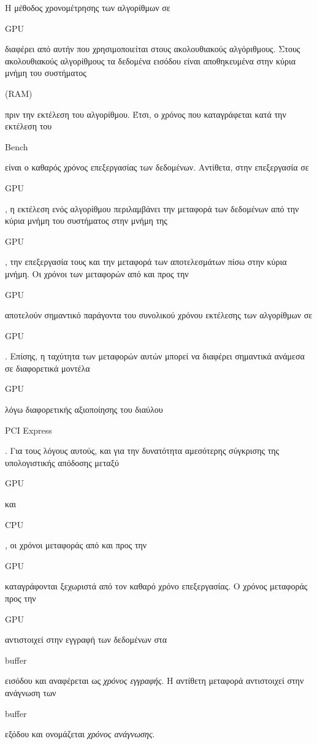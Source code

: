 Η μέθοδος χρονομέτρησης των αλγορίθμων σε \begin{english}GPU\end{english} διαφέρει από αυτήν που χρησιμοποιείται στους ακολουθιακούς αλγόριθμους. Στους ακολουθιακούς αλγορίθμους τα δεδομένα εισόδου είναι αποθηκευμένα στην κύρια μνήμη του συστήματος \begin{english}(RAM)\end{english} πριν την εκτέλεση του αλγορίθμου. Έτσι, ο χρόνος που καταγράφεται κατά την εκτέλεση του \begin{english}Bench\end{english} είναι ο καθαρός χρόνος επεξεργασίας των δεδομένων. Αντίθετα, στην επεξεργασία σε \begin{english}GPU\end{english}, η εκτέλεση ενός αλγορίθμου  περιλαμβάνει την μεταφορά των δεδομένων από την κύρια μνήμη του συστήματος στην μνήμη της \begin{english}GPU\end{english}, την επεξεργασία τους και την μεταφορά των αποτελεσμάτων πίσω στην κύρια μνήμη. Οι χρόνοι των μεταφορών από και προς την \begin{english}GPU\end{english} αποτελούν σημαντικό παράγοντα του συνολικού χρόνου εκτέλεσης των αλγορίθμων σε \begin{english}GPU\end{english}. Επίσης, η ταχύτητα των μεταφορών αυτών μπορεί να διαφέρει σημαντικά ανάμεσα σε 
διαφορετικά μοντέλα \begin{english}GPU\end{english} λόγω διαφορετικής αξιοποίησης του διαύλου \begin{english}PCI Express\end{english}. Για τους λόγους αυτούς, και για την δυνατότητα αμεσότερης σύγκρισης της υπολογιστικής απόδοσης μεταξύ \begin{english}GPU\end{english} και \begin{english}CPU\end{english}, οι χρόνοι μεταφοράς από και προς την \begin{english}GPU\end{english} καταγράφονται ξεχωριστά από τον καθαρό χρόνο επεξεργασίας. Ο χρόνος μεταφοράς προς την \begin{english}GPU\end{english} αντιστοιχεί στην εγγραφή των δεδομένων στα \begin{english}buffer\end{english} εισόδου και αναφέρεται ως \textit{χρόνος εγγραφής}. Η αντίθετη μεταφορά αντιστοιχεί στην ανάγνωση των \begin{english}buffer\end{english} εξόδου και ονομάζεται \textit{χρόνος ανάγνωσης}. 

